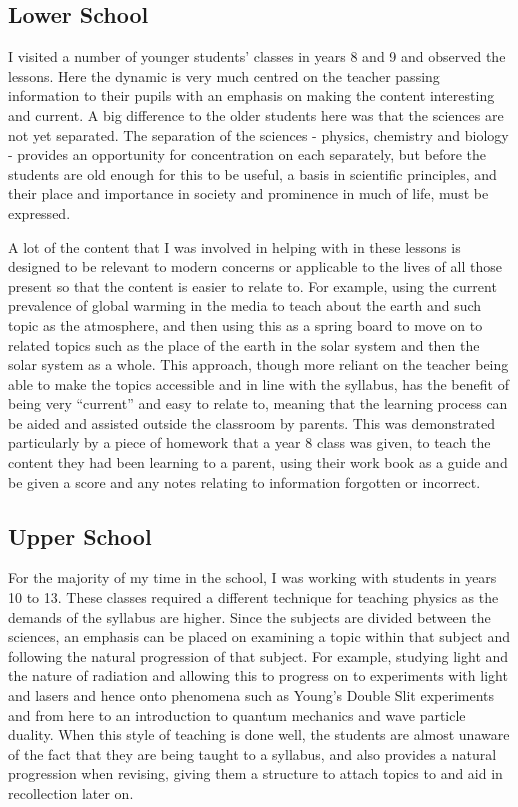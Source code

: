 	\subsection{Lower School} %
	\label{sub:lower_school}
		I visited a number of younger students' classes in years 8 and 9 and observed the lessons. Here the dynamic is very much centred on the teacher passing information to their pupils with an emphasis on making the content interesting and current. A big difference to the older students here was that the sciences are not yet separated. The separation of the sciences - physics, chemistry and biology - provides an opportunity for concentration on each separately, but before the students are old enough for this to be useful, a basis in scientific principles, and their place and importance in society and prominence in much of life, must be expressed.

		A lot of the content that I was involved in helping with in these lessons is designed to be relevant to modern concerns or applicable to the lives of all those present so that the content is easier to relate to. For example, using the current prevalence of global warming in the media to teach about the earth and such topic as the atmosphere, and then using this as a spring board to move on to related topics such as the place of the earth in the solar system and then the solar system as a whole. This approach, though more reliant on the teacher being able to make the topics accessible and in line with the syllabus, has the benefit of being very ``current'' and easy to relate to, meaning that the learning process can be aided and assisted outside the classroom by parents. This was demonstrated particularly by a piece of homework that a year 8 class was given, to teach the content they had been learning to a parent, using their work book as a guide and be given a score and any notes relating to information forgotten or incorrect.


	\subsection{Upper School} %
	\label{sub:upper_school}
		For the majority of my time in the school, I was working with students in years 10 to 13. These classes required a different technique for teaching physics as the demands of the syllabus are higher. Since the subjects are divided between the sciences, an emphasis can be placed on examining a topic within that subject and following the natural progression of that subject. For example, studying light and the nature of radiation and allowing this to progress on to experiments with light and lasers and hence onto phenomena such as Young's Double Slit experiments and from here to an introduction to quantum mechanics and wave particle duality. When this style of teaching is done well, the students are almost unaware of the fact that they are being taught to a syllabus, and also provides a natural progression when revising, giving them a structure to attach topics to and aid in recollection later on.

